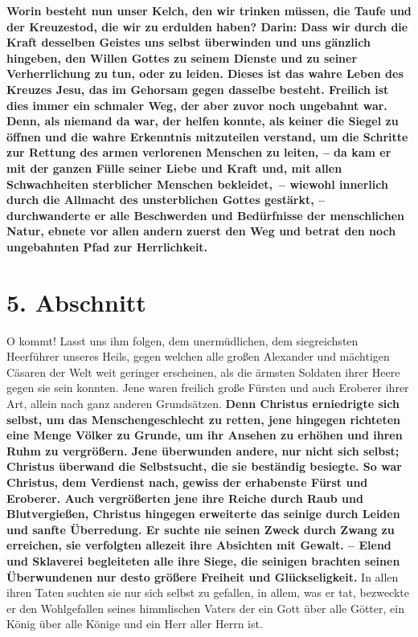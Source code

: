 \label{ref:04_04_kelch_taufe_kreuz}
\textbf{Worin besteht nun unser Kelch, den wir trinken müssen, die Taufe und
der
Kreuzestod, die wir zu erdulden haben? Darin: Dass wir durch die Kraft desselben
Geistes uns selbst überwinden und uns gänzlich hingeben, den Willen Gottes zu
seinem Dienste und zu seiner Verherrlichung zu tun, oder zu leiden. Dieses ist
das wahre Leben des Kreuzes Jesu, das im Gehorsam gegen dasselbe besteht.
Freilich ist dies immer ein schmaler Weg, der aber zuvor noch ungebahnt war.
Denn, als
niemand da war, der helfen konnte, als keiner die Siegel zu
öffnen und die wahre
Erkenntnis mitzuteilen verstand, um die Schritte zur Rettung des armen
verlorenen Menschen zu leiten, -- da kam er mit der ganzen Fülle seiner Liebe und
Kraft und, mit allen Schwachheiten sterblicher Menschen bekleidet,~-- wiewohl
innerlich durch die Allmacht des unsterblichen
Gottes
gestärkt, -- durchwanderte
er alle Beschwerden und Bedürfnisse der menschlichen Natur,
ebnete vor allen
andern zuerst den Weg und
betrat den noch ungebahnten Pfad zur Herrlichkeit.}

\section{5. Abschnitt} \label{kap4_ab5}

\label{ref:04_05_besigen}
O kommt! Lasst uns ihm folgen, dem unermüdlichen, dem siegreichsten Heerführer
unseres Heils, gegen welchen alle großen Alexander
und mächtigen Cäsaren der Welt
weit geringer erscheinen, als die ärmsten Soldaten ihrer Heere
 gegen sie sein
konnten. Jene waren freilich große Fürsten und auch Eroberer
 ihrer Art, allein
nach ganz anderen Grundsätzen. \textbf{Denn Christus erniedrigte sich selbst, um
das
Menschengeschlecht zu retten, jene hingegen richteten eine Menge Völker zu
Grunde, um ihr Ansehen zu erhöhen und ihren Ruhm zu vergrößern. Jene überwunden
andere, nur nicht sich selbst; Christus überwand die Selbstsucht, die sie
beständig besiegte. So war Christus, dem Verdienst nach, gewiss der erhabenste
Fürst und Eroberer. Auch vergrößerten jene ihre Reiche durch Raub und
Blutvergießen, Christus hingegen erweiterte das seinige durch Leiden und sanfte
Überredung. Er suchte nie seinen Zweck durch Zwang zu erreichen, sie verfolgten
allezeit ihre Absichten mit Gewalt. -- Elend und Sklaverei begleiteten alle ihre
Siege, die seinigen brachten seinen Überwundenen nur desto größere Freiheit und
Glückseligkeit.} In allen ihren Taten suchten sie nur sich selbst zu gefallen, in 
allem, was er tat, bezweckte
er den Wohlgefallen seines himmlischen Vaters
der ein Gott über alle Götter, ein König über alle Könige und ein Herr aller
Herrn ist.

